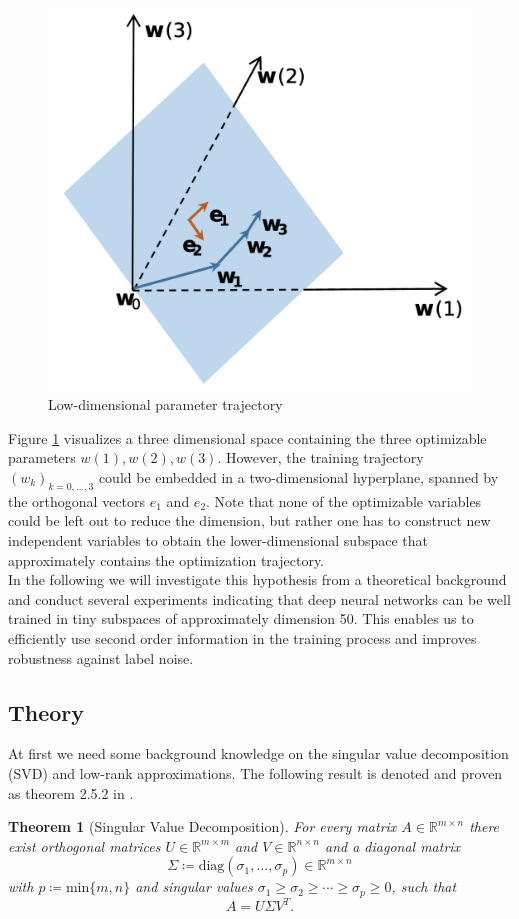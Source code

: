\documentclass[11pt, a4paper]{article}
\newtheorem{theorem}{Theorem}[section]
\newcommand{\R}{\mathds{R}}
\begin{document}
\begin{figure}[!h]
\centering
\includegraphics[width=0.45\linewidth]{images/trajectory.png}
\caption{Low-dimensional parameter trajectory}
\label{fig:trajectory}
\end{figure}  

Figure \ref{fig:trajectory} visualizes a three dimensional space containing the three optimizable parameters $w(1), w(2), w(3)$. However, the training trajectory $(w_k)_{k=0, \dots, 3}$ could be embedded in a two-dimensional hyperplane, spanned by the orthogonal vectors $e_1$ and $e_2$. Note that none of the optimizable variables could be left out to reduce the dimension, but rather one has to construct new independent variables to obtain the lower-dimensional subspace that approximately contains the optimization trajectory. \\

In the following we will investigate this hypothesis from a theoretical background and conduct several experiments indicating that deep neural networks can be well trained in tiny subspaces of approximately dimension 50. This enables us to efficiently use second order information in the training process and improves robustness against label noise. 

\subsection{Theory}

At first we need some background knowledge on the singular value decomposition (SVD) and low-rank approximations. The following result is denoted and proven as theorem 2.5.2 in \cite{SVD}.

\begin{theorem}[Singular Value Decomposition] \label{thm:svd}
For every matrix $A \in \R^{m \times n}$ there exist orthogonal matrices $U \in \R^{m \times m}$ and $V \in \R^{n \times n}$ and a diagonal matrix 
\[ \Sigma \coloneq \text{diag}(\sigma_1, \dots, \sigma_p) \in \R^{m \times n} \]
with $p \coloneq \text{min} \{ m,n \}$ and singular values $\sigma_1 \geq \sigma_2 \geq \cdots \geq \sigma_p \geq 0$, such that
\[ A = U \Sigma V^T. \]
\end{theorem}
\end{document}
